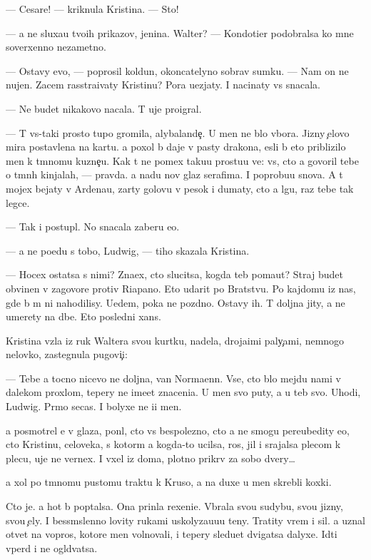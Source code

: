 \documentclass[10pt]{book}
\begin{document}
— Cesare! — kriknula Kristina. — Sto{\y}!

— {\Y}a ne sluxa{\y}u tvo{\y}ih prikazov, jen{\x}ina. Walter? — Kondotier podobralsa ko mne soverxenno nezametno.

— Ostavy {\y}evo, — poprosil koldun, okoncatelyno sobrav sumku. — Nam on ne nujen. Zacem rasstra{\y}ivaty Kristinu? Pora u{\y}ezjaty. I nacinaty vs{\e} snacala.

— Ne budet nikakovo nacala. T{\yi} uje proigral.

— T{\yi} vs{\e}-taki prosto tupo{\y} gromila, alybalande{\c}. U men{\ia} ne b{\yi}lo v{\yi}bora. Jizny {\c}elovo mira postavlena na kartu. {\Y}a poxol b{\yi} daje v pasty drakona, {\y}esli b{\yi} eto priblizilo men{\ia} k t{\e}mnomu kuzne{\c}u. Kak t{\yi} ne po{\y}mex taku{\y}u prostu{\y}u ve{\x}: vs{\e}, cto {\y}a govoril tebe o t{\e}mn{\yi}h kinjalah, — pravda. {\Y}a na{\y}du nov{\yi}{\y} glaz serafima. I poprobu{\y}u snova. A t{\yi} mojex bejaty v Ardenau, zar{\yi}ty golovu v pesok i dumaty, cto {\y}a lgu, raz tebe tak legce.

— Tak i postupl{\iu}. No snacala zaberu {\y}e{\y}o.

— {\Y}a ne po{\y}edu s tobo{\y}, Ludwig, — tiho skazala Kristina.

— Hocex ostatsa s nimi? Zna{\y}ex, cto slucitsa, kogda teb{\ia} po{\y}ma{\y}ut? Straj budet obvinen v zagovore protiv Riapano. Eto udarit po Bratstvu. Po kajdomu iz nas, gde b{\yi} m{\yi} ni nahodilisy. U{\y}edem, poka ne pozdno. Ostavy ih. T{\yi} doljna jity, a ne umerety na d{\yi}be. Eto posledni{\y} xans.

Kristina vz{\ia}la iz ruk Waltera svo{\y}u kurtku, nadela, droja{\x}imi paly{\c}ami, nemnogo nelovko, zastegnula pugovi{\c}i:

— Tebe {\y}a tocno nicevo ne doljna, van Normaenn. Vse, cto b{\yi}lo mejdu nami v dalekom proxlom, tepery ne ime{\y}et znaceni{\y}a. U men{\ia} svo{\y} puty, a u teb{\ia} svo{\y}. Uhodi, Ludwig. Pr{\ia}mo se{\y}cas. I bolyxe ne i{\x}i men{\ia}.

{\Y}a posmotrel {\y}e{\y} v glaza, pon{\ia}l, cto vs{\e} bespolezno, cto {\y}a ne smogu pereubedity {\y}e{\y}o, cto Kristinu, celoveka, s kotor{\yi}m {\y}a kogda-to ucilsa, ros, jil i srajalsa plecom k plecu, uje ne vernex. I v{\yi}xel iz doma, plotno prikr{\yi}v za sobo{\y} dvery…

{\Y}a xol po t{\e}mnomu pustomu traktu k Kruso, a na duxe u men{\ia} skrebli koxki.

Cto je. {\Y}a hot{\ia} b{\yi} pop{\yi}talsa. Ona prin{\ia}la rexeni{\y}e. V{\yi}brala svo{\y}u sudybu, svo{\y}u jizny, svo{\y}u {\c}ely. I bessm{\yi}slenno lovity rukami uskolyza{\y}u{\x}u{\y}u teny. Tratity vrem{\ia} i sil{\yi}. {\Y}a uznal otvet{\yi} na vopros{\yi}, kotor{\yi}{\y}e men{\ia} volnovali, i tepery sledu{\y}et dvigatsa dalyxe. Idti vper{\e}d i ne ogl{\ia}d{\yi}vatsa.
\end{document}
